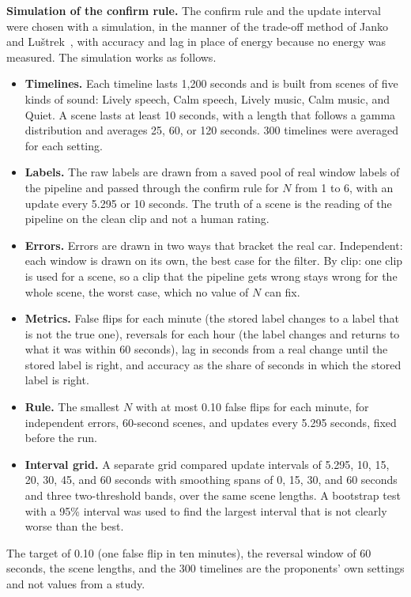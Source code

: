 \textbf{Simulation of the confirm rule.} The confirm rule and the update interval were chosen with a simulation, in the manner of the trade-off method of Janko and Lu{\v{s}}trek~\cite{janko2021energy}, with accuracy and lag in place of energy because no energy was measured. The simulation works as follows.
\begin{itemize}
    \item \textbf{Timelines.} Each timeline lasts 1,200 seconds and is built from scenes of five kinds of sound: Lively speech, Calm speech, Lively music, Calm music, and Quiet. A scene lasts at least 10 seconds, with a length that follows a gamma distribution and averages 25, 60, or 120 seconds. 300 timelines were averaged for each setting.
    \item \textbf{Labels.} The raw labels are drawn from a saved pool of real window labels of the pipeline and passed through the confirm rule for $N$ from 1 to 6, with an update every 5.295 or 10 seconds. The truth of a scene is the reading of the pipeline on the clean clip and not a human rating.
    \item \textbf{Errors.} Errors are drawn in two ways that bracket the real car. Independent: each window is drawn on its own, the best case for the filter. By clip: one clip is used for a scene, so a clip that the pipeline gets wrong stays wrong for the whole scene, the worst case, which no value of $N$ can fix.
    \item \textbf{Metrics.} False flips for each minute (the stored label changes to a label that is not the true one), reversals for each hour (the label changes and returns to what it was within 60 seconds), lag in seconds from a real change until the stored label is right, and accuracy as the share of seconds in which the stored label is right.
    \item \textbf{Rule.} The smallest $N$ with at most 0.10 false flips for each minute, for independent errors, 60-second scenes, and updates every 5.295 seconds, fixed before the run.
    \item \textbf{Interval grid.} A separate grid compared update intervals of 5.295, 10, 15, 20, 30, 45, and 60 seconds with smoothing spans of 0, 15, 30, and 60 seconds and three two-threshold bands, over the same scene lengths. A bootstrap test with a 95\% interval was used to find the largest interval that is not clearly worse than the best.
\end{itemize}
The target of 0.10 (one false flip in ten minutes), the reversal window of 60 seconds, the scene lengths, and the 300 timelines are the proponents' own settings and not values from a study.

